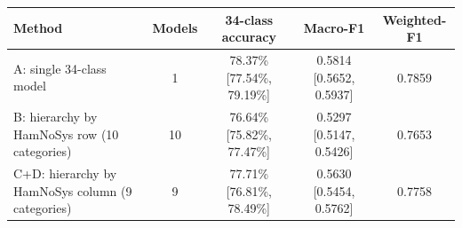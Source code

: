 \begin{tabular}{lcccc}
\toprule
\textbf{Method} & \textbf{Models} & \textbf{34-class accuracy} & \textbf{Macro-F1} & \textbf{Weighted-F1} \\
\midrule
A: single 34-class model & 1 & 78.37\% [77.54\%, 79.19\%] & 0.5814 [0.5652, 0.5937] & 0.7859 \\
B: hierarchy by HamNoSys row (10 categories) & 10 & 76.64\% [75.82\%, 77.47\%] & 0.5297 [0.5147, 0.5426] & 0.7653 \\
C+D: hierarchy by HamNoSys column (9 categories) & 9 & 77.71\% [76.81\%, 78.49\%] & 0.5630 [0.5454, 0.5762] & 0.7758 \\
\bottomrule
\end{tabular}
